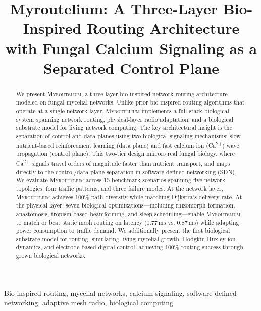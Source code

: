 \documentclass[conference,10pt]{IEEEtran}
\newcommand{\myc}{\textsc{Myroutelium}}
\newcommand{\calcium}{Ca\textsuperscript{2+}}
\begin{document}
\title{Myroutelium: A Three-Layer Bio-Inspired Routing Architecture\\with Fungal Calcium Signaling as a Separated Control Plane}

\author{
}

\maketitle

\begin{abstract}
We present \myc{}, a three-layer bio-inspired network routing architecture modeled on fungal mycelial networks. Unlike prior bio-inspired routing algorithms that operate at a single network layer, \myc{} implements a full-stack biological system spanning network routing, physical-layer radio adaptation, and a biological substrate model for living network computing. The key architectural insight is the separation of control and data planes using two biological signaling mechanisms: slow nutrient-based reinforcement learning (data plane) and fast calcium ion (\calcium{}) wave propagation (control plane). This two-tier design mirrors real fungal biology, where \calcium{} signals travel orders of magnitude faster than nutrient transport, and maps directly to the control/data plane separation in software-defined networking (SDN). We evaluate \myc{} across 15 benchmark scenarios spanning five network topologies, four traffic patterns, and three failure modes. At the network layer, \myc{} achieves 100\% path diversity while matching Dijkstra's delivery rate. At the physical layer, seven biological optimizations---including rhizomorph formation, anastomosis, tropism-based beamforming, and sleep scheduling---enable \myc{} to match or beat static mesh routing on latency (0.77\,ms vs. 0.87\,ms) while adapting power consumption to traffic demand. We additionally present the first biological substrate model for routing, simulating living mycelial growth, Hodgkin-Huxley ion dynamics, and electrode-based digital control, achieving 100\% routing success through grown biological networks.
\end{abstract}

\begin{IEEEkeywords}
Bio-inspired routing, mycelial networks, calcium signaling, software-defined networking, adaptive mesh radio, biological computing
\end{IEEEkeywords}
\end{document}
